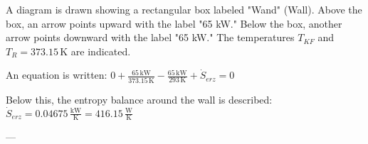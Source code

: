 A diagram is drawn showing a rectangular box labeled "Wand" (Wall). Above the box, an arrow points upward with the label "65 kW." Below the box, another arrow points downward with the label "65 kW." The temperatures \( T_{KF} \) and \( T_R = 373.15 \, \text{K} \) are indicated.  

An equation is written:  
\( 0 + \frac{65 \, \text{kW}}{373.15 \, \text{K}} - \frac{65 \, \text{kW}}{293 \, \text{K}} + \dot{S}_{erz} = 0 \)  

Below this, the entropy balance around the wall is described:  
\( \dot{S}_{erz} = 0.04675 \, \frac{\text{kW}}{\text{K}} = 416.15 \, \frac{\text{W}}{\text{K}} \)  

---